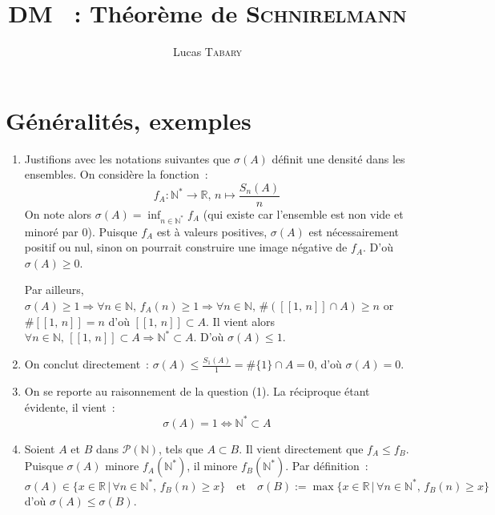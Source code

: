 \documentclass{article}
\title{DM \No 1~: Théorème de \textsc{Schnirelmann}}
\author{Lucas \textsc{Tabary}}
\date{}
\newcommand{\ie}[2]{\left[\!\left[#1,\, #2\right]\!\right]} %
\begin{document}
  \maketitle{}

  \section{Généralités, exemples}
  \begin{enumerate}
    \item Justifions avec les notations suivantes que $\sigma(A)$ définit une densité dans les ensembles. On considère la fonction~:
    \[
      f_A\colon \mathbb{N}^* \longrightarrow \mathbb{R},\, n \longmapsto \frac{S_n(A)}{n}
    \]
    On note alors $\sigma(A) = \inf_{n \in \mathbb{N}^*} f_A$ (qui existe car l'ensemble est non vide et minoré par 0). Puisque $f_A$ est à valeurs positives, $\sigma(A)$ est nécessairement positif ou nul, sinon on pourrait construire une image négative de $f_A$. D'où $\sigma(A) \geqslant 0$.

    Par ailleurs, $\sigma(A) \geqslant 1 \Longrightarrow \forall n \in \mathbb{N},\, f_A(n) \geqslant 1 \Longrightarrow \forall n \in \mathbb{N},\, \#\left(\ie{1}{n} \cap A\right) \geqslant n$ or $\#\ie{1}{n} = n$ d'où $\ie{1}{n} \subset A$.
    Il vient alors $\forall n \in \mathbb{N},\, \ie{1}{n} \subset A \Longrightarrow \mathbb{N}^* \subset A$. D'où $\sigma(A) \leqslant 1$.

    \item On conclut directement~: $\sigma(A) \leqslant \frac{S_1(A)}{1} = \#\{1\} \cap A = 0$, d'où $\sigma(A) = 0$.

    \item On se reporte au raisonnement de la question (1). La réciproque étant évidente, il vient~:
    \[
      \sigma(A) = 1 \iff \mathbb{N}^* \subset A
    \]

    \item Soient $A$ et $B$ dans $\mathcal{P}(\mathbb{N})$, tels que $A \subset B$. Il vient directement que $f_A \leqslant f_B$. Puisque $\sigma(A)$ minore $f_A(\mathbb{N}^*)$, il minore $f_B(\mathbb{N}^*)$. Par définition~:
    \[
      \sigma(A) \in \{x \in \mathbb{R} \,\vert\, \forall n \in \mathbb{N}^*,\, f_B(n) \geqslant x\} \quad\text{et}\quad \sigma(B) := \max \{x \in \mathbb{R} \,\vert\, \forall n \in \mathbb{N}^*,\, f_B(n) \geqslant x\}
    \]
    d'où $\sigma(A) \leqslant \sigma(B)$.


\end{enumerate}
\end{document}
